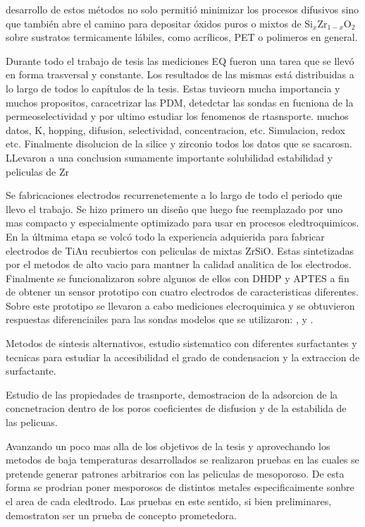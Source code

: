desarrollo de estos métodos no solo permitió minimizar los procesos difusivos sino que también abre el camino para depositar óxidos puros o mixtos de Si$_x$Zr$_{1-x}$O$_2$ sobre sustratos termicamente lábiles, como acrílicos, PET o polimeros en general.

Durante todo el trabajo de tesis las mediciones EQ fueron una tarea que se llevó en forma trasversal y constante. Los resultados de las mismas está distribuidas a lo largo de todos lo capítulos de la tesis.  Estas tuvieorn mucha importancia y muchos propositos, caracetrizar las PDM, detedctar las sondas en fucniona de la permeoselectividad y por ultimo estudiar los fenomenos de rtasnsporte.
muchos datos, K, hopping, difusion, selectividad, concentracion, etc. Simulacion, redox etc. Finalmente disolucion de la silice y zirconio
todos los datos que se sacarosn. LLevaron a una conclusion sumamente importante solubilidad estabilidad y peliculas de Zr

Se fabricaciones electrodos recurrenetemente a lo largo de todo el periodo que llevo el trabajo. Se hizo primero un diseño que luego fue reemplazado por uno mas compacto y especialmente optimizado para usar en procesos eledtroquimicos. En la últmima etapa se volcó todo la experiencia adquierida para fabricar electrodos de Ti\textbar Au recubiertos con peliculas de mixtas ZrSiO. Estas sintetizadas por el metodos de alto vacio para mantner la calidad analitica de los electrodos. Finalmente se funcionalizaron sobre algunos de ellos con DHDP y APTES a fin de obtener un sensor prototipo con cuatro electrodos de caracteristicas diferentes. Sobre este prototipo se llevaron a cabo mediciones elecroquimica y se obtuvieron respuestas diferenciailes para las sondas modelos que se utilizaron: \ferroferri, \ferroceno y \aminorutenio.   


Metodos de sintesis alternativos, estudio sistematico con diferentes surfactantes y tecnicas para estudiar la accesibilidad el grado de condensacion y la extraccion de surfactante.

Estudio de las propiedades de trasnporte, demostracion de la adsorcion de la concnetracion dentro de los poros coeficientes de disfusion y de la estabilida de las pelicuas.

Avanzando un poco mas alla de los objetivos de la tesis y aprovechando los metodos de baja temperaturas desarrollados se realizaron pruebas en las cuales se pretende generar patrones arbitrarios con las peliculas de mesoporoso. De esta forma se prodrian poner mesporosos de distintos metales especificaimente sonbre el area de cada eledtrodo. Las pruebas en este sentido, si bien preliminares, demostraton ser un prueba de concepto prometedora.

